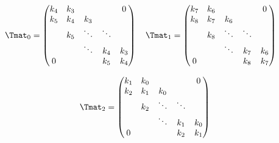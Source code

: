 \begin{equation*}
  \Tmat_0 = \leftmatrix
    k_4 & k_3 &         &         & 0       \\
    k_5 & k_4 & k_3 &         &         \\
            & k_5 & \ddots  & \ddots  &         \\
            &         & \ddots  & k_4 & k_3 \\
    0       &         &         & k_5 & k_4
  \rightmatrix \quad 
  \hfill
  \Tmat_1 = \leftmatrix
    k_7 & k_6 &         &         & 0       \\
    k_8 & k_7 & k_6 &         &         \\
            & k_8 & \ddots  & \ddots  &         \\
            &         & \ddots  & k_7 & k_6 \\
    0       &         &         & k_8 & k_7 \\
  \rightmatrix \quad
\end{equation*}

\begin{equation*}
  \Tmat_2 = \leftmatrix
    k_1 & k_0 &         &         & 0       \\
    k_2 & k_1 & k_0 &         &         \\
            & k_2 & \ddots  & \ddots  &         \\
            &         & \ddots  & k_1 & k_0 \\
    0       &         &         & k_2 & k_1 \\
  \rightmatrix
\end{equation*}


